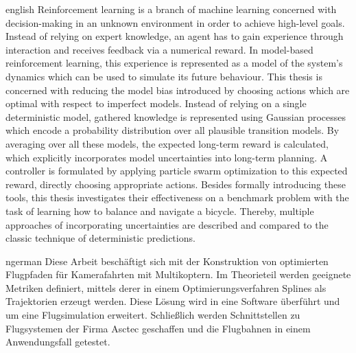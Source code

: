 \begin{Abstract}{english}
Reinforcement learning is a branch of machine learning concerned with decision-making in an unknown environment in order to achieve high-level goals.
Instead of relying on expert knowledge, an agent has to gain experience through interaction and receives feedback via a numerical reward.
In model-based reinforcement learning, this experience is represented as a model of the system's dynamics which can be used to simulate its future behaviour.
This thesis is concerned with reducing the model bias introduced by choosing actions which are optimal with respect to imperfect models.
Instead of relying on a single deterministic model, gathered knowledge is represented using Gaussian processes which encode a probability distribution over all plausible transition models.
By averaging over all these models, the expected long-term reward is calculated, which explicitly incorporates model uncertainties into long-term planning.
A controller is formulated by applying particle swarm optimization to this expected reward, directly choosing appropriate actions.
Besides formally introducing these tools, this thesis investigates their effectiveness on a benchmark problem with the task of learning how to balance and navigate a bicycle.
Thereby, multiple approaches of incorporating uncertainties are described and compared to the classic technique of deterministic predictions.
\end{Abstract}

\begin{Abstract}{ngerman}
Diese Arbeit beschäftigt sich mit der Konstruktion von optimierten Flugpfaden für Kamerafahrten mit Multikoptern.
Im Theorieteil werden geeignete Metriken definiert, mittels derer in einem Optimierungsverfahren Splines als Trajektorien erzeugt werden.
Diese Lösung wird in eine Software überführt und um eine Flugsimulation erweitert.
Schließlich werden Schnittstellen zu Flugsystemen der Firma Asctec geschaffen und die Flugbahnen in einem Anwendungsfall getestet.
\end{Abstract}
